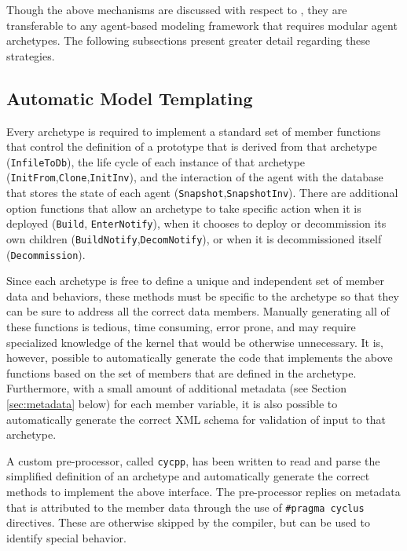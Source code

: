 Though the above mechanisms are discussed with respect to \Cyclus, they are
transferable to any agent-based modeling framework that requires modular agent
archetypes. The following subsections present greater detail regarding these
strategies.

\subsection{Automatic Model Templating}
\label{subsec-ppgc}

Every \Cyclus archetype is required to implement a standard set of member
functions that control the definition of a prototype that is derived from that
archetype (\texttt{InfileToDb}), the life cycle of each instance of that
archetype (\texttt{InitFrom},\texttt{Clone},\texttt{InitInv}), and the
interaction of the agent with the database that stores the state of each agent
(\texttt{Snapshot},\texttt{SnapshotInv}).  There are additional option
functions that allow an archetype to take specific action when it is deployed
(\texttt{Build}, \texttt{EnterNotify}), when it chooses to deploy or
decommission its own children (\texttt{BuildNotify},\texttt{DecomNotify}), or
when it is decommissioned itself (\texttt{Decommission}).

Since each archetype is free to define a unique and independent set of member
data and behaviors, these methods must be specific to the archetype so that
they can be sure to address all the correct data members.  Manually generating
all of these functions is tedious, time consuming, error prone, and may
require specialized knowledge of the \Cyclus kernel that would be otherwise
unnecessary.  It is, however, possible to automatically generate the code that
implements the above functions based on the set of members that are defined in
the archetype.  Furthermore, with a small amount of additional metadata (see
Section \ref{sec:metadata} below) for each member variable, it is also
possible to automatically generate the correct \gls{XML} schema for validation
of input to that archetype.

A custom pre-processor, called \texttt{cycpp}, has been written to read and
parse the simplified definition of an archetype and automatically generate the
correct methods to implement the above interface.  The pre-processor replies on
metadata that is attributed to the member data through the use of
\texttt{\#pragma cyclus} directives.  These are otherwise skipped by the
compiler, but can be used to identify special behavior.

